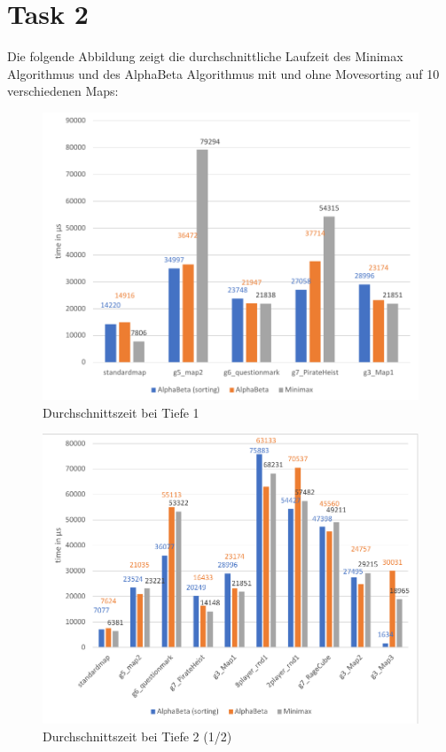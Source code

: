 \section{Task 2}

Die folgende Abbildung zeigt die durchschnittliche Laufzeit des Minimax Algorithmus und des AlphaBeta Algorithmus mit und ohne Movesorting auf 10 verschiedenen Maps:

\begin{figure}[h]
	\begin{center}
		\includegraphics{Depth_1_avgtime.pdf}
		\caption{Durchschnittszeit bei Tiefe 1}
		\label{fig::avgtime Depth1}
	\end{center}
\end{figure}
\begin{figure}[h]
	\begin{center}
		\includegraphics{Depth_2_1_avgtime.pdf}
		\caption{Durchschnittszeit bei Tiefe 2 (1/2)}
		\label{fig::avgtime Depth2.1}
	\end{center}
\end{figure}
